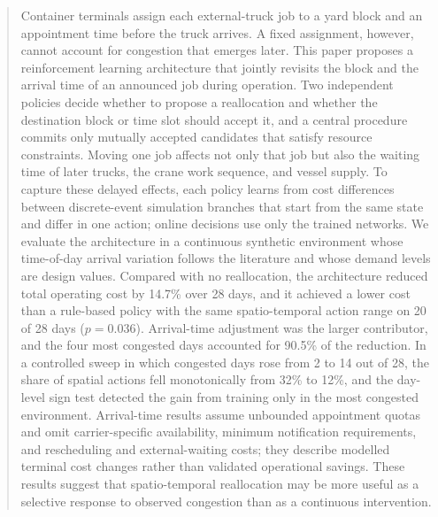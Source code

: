 \documentclass[a4paper]{llncs}
\begin{document}
\begin{abstract}
Container terminals assign each external-truck job to a yard block and
an appointment time before the truck arrives. A fixed assignment,
however, cannot account for congestion that emerges later. This paper
proposes a reinforcement learning architecture that jointly revisits the
block and the arrival time of an announced job during operation. Two
independent policies decide whether to propose a reallocation and
whether the destination block or time slot should accept it, and a
central procedure commits only mutually accepted candidates that satisfy
resource constraints. Moving one job affects not only that job but also
the waiting time of later trucks, the crane work sequence, and vessel
supply. To capture these delayed effects, each policy learns from cost
differences between discrete-event simulation branches that start from
the same state and differ in one action; online decisions use only the
trained networks. We evaluate the architecture in a continuous synthetic
environment whose time-of-day arrival variation follows the literature
and whose demand levels are design values. Compared with no
reallocation, the architecture reduced total operating cost by 14.7\%
over 28 days, and it achieved a lower cost than a rule-based policy with
the same spatio-temporal action range on 20 of 28 days ($p=0.036$).
Arrival-time adjustment was the larger contributor, and the four most
congested days accounted for 90.5\% of the reduction. In a controlled
sweep in which congested days rose from 2 to 14 out of 28, the share of
spatial actions fell monotonically from 32\% to 12\%, and the day-level sign test
detected the gain from training only in the most congested environment. Arrival-time results assume unbounded appointment quotas and omit
carrier-specific availability, minimum notification requirements, and
rescheduling and external-waiting costs; they describe modelled terminal
cost changes rather than validated operational savings. These results suggest that spatio-temporal reallocation may be
more useful as a selective response to observed congestion than as a
continuous intervention.

\end{abstract}

\end{document}
